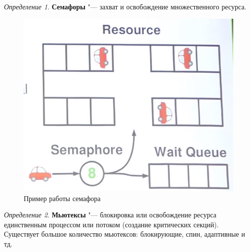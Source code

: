 \documentclass[bachelor, och, book]{SCWorks}
\theoremstyle{remark}
\newtheorem{definition}{Определение}
\begin{document}
    \begin{definition}
        \textbf{Семафоры} "--- захват и освобождение множественного ресурса.
    \end{definition}

    \begin{figure}[H]
        \begin{center}
            \includegraphics[scale=0.40]{res/example-Semaphore.png}
            \caption{Пример работы семафора}
        \end{center}
    \end{figure}


    \begin{definition}
        \textbf{Мьютексы} "--- блокировка или освобождение ресурса единственным процессом или потоком (создание критических секций). Существует большое количество мьютексов: блокирующие, спин, адаптивные и тд.
    \end{definition}
\end{document}
